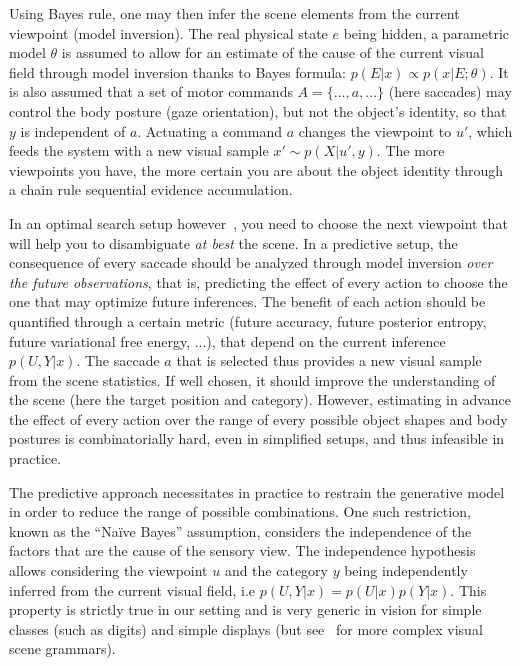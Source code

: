 Using Bayes rule, one may then infer the scene elements from the current viewpoint (model inversion). The real physical state $e$ being hidden, a parametric model $\theta$ is assumed to allow for an estimate of the cause of the current visual field through model inversion thanks to Bayes formula: $p(E|x) \propto p(x|E;\theta)$. It is also assumed that a set of motor commands $A = \{..., a, ...\}$ (here saccades) may control the body posture (gaze orientation), but not the object's identity, so that $y$ is independent of $a$. Actuating a command $a$ changes the viewpoint to $u'$, which feeds the system with a new visual sample $x'\sim p(X|u', y)$. The more viewpoints you have, the more certain you are about the object identity through a chain rule sequential evidence accumulation.

In an optimal search setup however~\cite{Najemnik05}, you need to choose the next viewpoint that will help you to disambiguate \emph{at best} the scene. In a predictive setup, the consequence of every saccade should be analyzed through model inversion \emph{over the future observations}, that is, predicting the effect of every action to choose the one that may optimize future inferences. The benefit of each action should be quantified through a certain metric (future accuracy, future posterior entropy, future variational free energy, ...), that depend on the current inference $p(U,Y|x)$. The saccade $a$ that is selected thus provides a new visual sample from the scene statistics. If well chosen, it should improve the understanding of the scene (here the target position and category). However, estimating in advance the effect of every action over the range of every possible object shapes and body postures is combinatorially hard, even in simplified setups, and thus infeasible in practice.

The predictive approach necessitates in practice to restrain the generative model in order to reduce the range of possible combinations. One such restriction, known as the ``Naïve Bayes'' assumption, considers the independence of the factors that are the cause of the sensory view.
The independence hypothesis allows considering the viewpoint $u$ and the category $y$ being independently inferred from the current visual field, i.e $p(U,Y|x) = p(U|x) p(Y|x)$. This property is strictly true in our setting and is very generic in vision for simple classes (such as digits) and simple displays (but see~\cite{Vo12} for more complex visual scene grammars).
%

